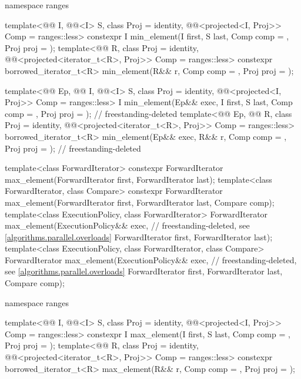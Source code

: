 \begin{codeblock}
{  namespace ranges {
    template<@@ I, @@<I> S, class Proj = identity,
             @@<projected<I, Proj>> Comp = ranges::less>
      constexpr I min_element(I first, S last, Comp comp = {}, Proj proj = {});
    template<@@ R, class Proj = identity,
             @@<projected<iterator_t<R>, Proj>> Comp = ranges::less>
      constexpr borrowed_iterator_t<R>
        min_element(R&& r, Comp comp = {}, Proj proj = {});

    template<@@ Ep, @@ I, @@<I> S,
             class Proj = identity,
             @@<projected<I, Proj>> Comp = ranges::less>
      I min_element(Ep&& exec, I first, S last, Comp comp = {},
                    Proj proj = {});                                        // freestanding-deleted
    template<@@ Ep, @@ R,
             class Proj = identity,
             @@<projected<iterator_t<R>, Proj>> Comp = ranges::less>
      borrowed_iterator_t<R>
        min_element(Ep&& exec, R&& r, Comp comp = {}, Proj proj = {});      // freestanding-deleted
  }

  template<class ForwardIterator>
    constexpr ForwardIterator max_element(ForwardIterator first, ForwardIterator last);
  template<class ForwardIterator, class Compare>
    constexpr ForwardIterator max_element(ForwardIterator first, ForwardIterator last,
                                          Compare comp);
  template<class ExecutionPolicy, class ForwardIterator>
    ForwardIterator max_element(ExecutionPolicy&& exec,         // freestanding-deleted, see \ref{algorithms.parallel.overloads}
                                ForwardIterator first, ForwardIterator last);
  template<class ExecutionPolicy, class ForwardIterator, class Compare>
    ForwardIterator max_element(ExecutionPolicy&& exec,         // freestanding-deleted, see \ref{algorithms.parallel.overloads}
                                ForwardIterator first, ForwardIterator last,
                                Compare comp);

  namespace ranges {
    template<@@ I, @@<I> S, class Proj = identity,
             @@<projected<I, Proj>> Comp = ranges::less>
      constexpr I max_element(I first, S last, Comp comp = {}, Proj proj = {});
    template<@@ R, class Proj = identity,
             @@<projected<iterator_t<R>, Proj>> Comp = ranges::less>
      constexpr borrowed_iterator_t<R>
        max_element(R&& r, Comp comp = {}, Proj proj = {});

}}
\end{codeblock}
